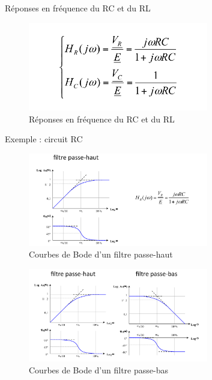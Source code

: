 \documentclass[a4paper]{article}
\begin{document}
            Réponses en fréquence du RC et du RL
            \begin{figure}[H]
                \begin{center}
                    \includegraphics[width=0.7\textwidth]{fig/2_reponse2.png}
                    \caption{Réponses en fréquence du RC et du RL}
                    \label{fig:2_superposition}
                \end{center}
            \end{figure}
            Exemple : circuit RC
            \begin{figure}[H]
                \begin{center}
                    \includegraphics[width=0.7\textwidth]{fig/2_reponse_RC1.png}
                    \caption{Courbes de Bode d'un filtre passe-haut}
                    \label{fig:2_superposition}
                \end{center}
            \end{figure}
            \begin{figure}[H]
                \begin{center}
                    \includegraphics[width=0.7\textwidth]{fig/2_reponse_RC2.png}
                    \caption{Courbes de Bode d'un filtre passe-bas}
                    \label{fig:2_superposition}
                \end{center}
            \end{figure}
\end{document}
